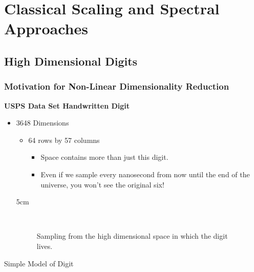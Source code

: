 \chapter{Classical Scaling and Spectral Approaches}



\section{High Dimensional Digits}

\subsection{Motivation for Non-Linear Dimensionality Reduction}

\textbf{USPS Data Set Handwritten Digit}
\begin{itemize}
\item 3648 Dimensions

\begin{itemize}
\item 64 rows by 57 columns

\begin{itemize}
\item Space contains more than just this digit.
\item Even if we sample every nanosecond from now until the end of the universe,
you won't see the original six!
\end{itemize}
\end{itemize}
5cm

\begin{center}
%
\begin{figure}


\begin{centering}
\\
\par\end{centering}

\caption{Sampling from the high dimensional space in which the digit lives.}



\end{figure}

\par\end{center}

\end{itemize}
Simple Model of Digit

